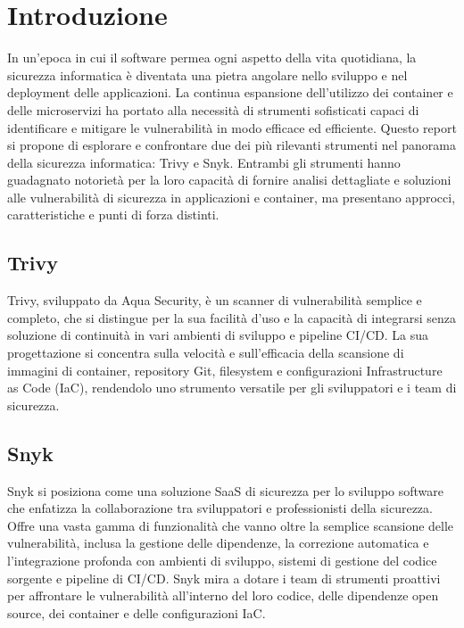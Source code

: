 \chapter{Introduzione}
In un'epoca in cui il software permea ogni aspetto della vita quotidiana, la sicurezza informatica è diventata una pietra angolare nello sviluppo e nel deployment delle applicazioni. La continua espansione dell'utilizzo dei container e delle microservizi ha portato alla necessità di strumenti sofisticati capaci di identificare e mitigare le vulnerabilità in modo efficace ed efficiente. Questo report si propone di esplorare e confrontare due dei più rilevanti strumenti nel panorama della sicurezza informatica: Trivy e Snyk. Entrambi gli strumenti hanno guadagnato notorietà per la loro capacità di fornire analisi dettagliate e soluzioni alle vulnerabilità di sicurezza in applicazioni e container, ma presentano approcci, caratteristiche e punti di forza distinti.

\section*{Trivy}

Trivy, sviluppato da Aqua Security, è un scanner di vulnerabilità semplice e completo, che si distingue per la sua facilità d'uso e la capacità di integrarsi senza soluzione di continuità in vari ambienti di sviluppo e pipeline CI/CD. La sua progettazione si concentra sulla velocità e sull'efficacia della scansione di immagini di container, repository Git, filesystem e configurazioni Infrastructure as Code (IaC), rendendolo uno strumento versatile per gli sviluppatori e i team di sicurezza.

\section*{Snyk}

Snyk si posiziona come una soluzione SaaS di sicurezza per lo sviluppo software che enfatizza la collaborazione tra sviluppatori e professionisti della sicurezza. Offre una vasta gamma di funzionalità che vanno oltre la semplice scansione delle vulnerabilità, inclusa la gestione delle dipendenze, la correzione automatica e l'integrazione profonda con ambienti di sviluppo, sistemi di gestione del codice sorgente e pipeline di CI/CD. Snyk mira a dotare i team di strumenti proattivi per affrontare le vulnerabilità all'interno del loro codice, delle dipendenze open source, dei container e delle configurazioni IaC.

